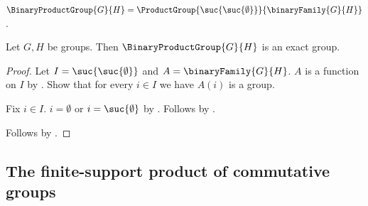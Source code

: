 \begin{definition}\label{binary_product_group}
    $\BinaryProductGroup{G}{H}
        =\ProductGroup{\suc{\suc{\emptyset}}}{
            \binaryFamily{G}{H}}$.
\end{definition}

\begin{proposition}\label{binary_product_group_is_exact}
    Let $G,H$ be groups.
    Then $\BinaryProductGroup{G}{H}$ is an exact group.
\end{proposition}
\begin{proof}
    Let $I=\suc{\suc{\emptyset}}$ and $A=\binaryFamily{G}{H}$.
    $A$ is a function on $I$ by
        .
    Show that for every $i\in I$ we have $A(i)$ is a group.
    \begin{subproof}
        Fix $i\in I$.
        $i=\emptyset$ or $i=\suc{\emptyset}$ by
            .
        Follows by .
    \end{subproof}
    Follows by .
\end{proof}

\subsection{The finite-support product of commutative groups}

